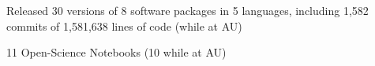 \begin{veryTightItemize}
    \item Released 30 versions of 8 software packages in 5 languages, including 
        1,582 commits of 1,581,638 lines of code (while at AU)
    \item 11 Open-Science Notebooks (10 while at AU)
\end{veryTightItemize}
